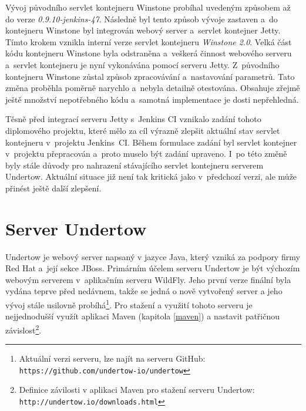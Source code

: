         \medskip
        Vývoj původního servlet kontejneru Winstone probíhal uvedeným způsobem 
        až do verze \emph{0.9.10-jenkins-47}. Následně byl tento způsob vývoje zastaven
        a~do kontejneru Winstone byl integrován webový server a~servlet kontejner
        Jetty. Tímto krokem vznikla 
        interní verze servlet kontejneru \emph{Winstone 2.0}. Velká část kódu 
        kontejneru Winstone byla odstraněna a~veškerá činnost webového serveru a~servlet 
        kontejneru je nyní vykonávána pomocí serveru Jetty. Z~původního kontejneru Winstone
        zůstal způsob zpracovávání a~nastavování parametrů. 
        Tato změna proběhla poměrně narychlo
        a~nebyla detailně otestována. Obsahuje zřejmě ještě množství nepotřebného kódu
        a~samotná implementace je dosti nepřehledná.

        
        \medskip
        Těsně před integrací serveru Jetty s~Jenkins CI
        vznikalo zadání tohoto diplomového projektu, které mělo za cíl
        výrazně zlepšit aktuální stav servlet kontejneru v~projektu Jenkins~CI. Během
        formulace zadání byl servlet kontejner v~projektu přepracován a~proto
        muselo být zadání upraveno. I~po této změně byly stále důvody pro 
        nahrazení stávajícího servlet kontejneru serverem Undertow.
        Aktuální situace již není tak kritická jako v~předchozí verzi,
        ale může přinést ještě další zlepšení.
                

    \section{Server Undertow} \label{undertow}
        Undertow je webový server napsaný v jazyce Java, 
        který vzniká za podpory firmy Red Hat a~její sekce JBoss.
        Primárním účelem serveru Undertow je být výchozím webovým serverem v~aplikačním serveru WildFly.
        Jeho první verze finální byla vydána teprve před nedávnem, takže se jedná o
        nově vytvořený server a jeho vývoj stále usilovně 
        probíhá\footnote{Aktuální verzi serveru, lze najít na serveru GitHub: 
        \texttt{https://github.com/undertow-io/undertow}}. Pro stažení a využití tohoto serveru
        je nejjednodušší využít aplikaci Maven (kapitola \ref{maven}) a nastavit patřičnou 
        závislost\footnote{Definice závilosti v aplikaci Maven pro stažení serveru Undertow: 
        \texttt{http://undertow.io/downloads.html} }.

